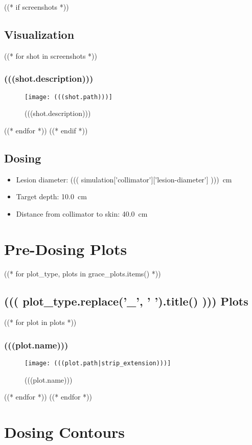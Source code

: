\documentclass[12pt]{article}
\begin{document}
((* if screenshots *))
\subsection{Visualization}
((* for shot in screenshots *))
	\subsubsection{(((shot.description)))}
	\begin{figure}[H]
	\centering
	\texttt{[image: (((shot.path)))]}
	\caption{(((shot.description)))}
	\end{figure}
((* endfor *))
((* endif *))

\subsection{Dosing}
\begin{itemize}
	\item Lesion diameter: \SI{((( simulation['collimator']['lesion-diameter']  )))}{\cm}
	\item Target depth: \SI{10.0}{\cm}
	\item Distance from collimator to skin: \SI{40.0}{\cm}
\end{itemize}

\section{Pre-Dosing Plots}
((* for plot_type, plots in grace_plots.items() *))
	\subsection{((( plot_type.replace('_', ' ').title() ))) Plots}
		((* for plot in plots *))
			\subsubsection{(((plot.name)))}
			\begin{figure}[H]
			\centering
			\texttt{[image: (((plot.path|strip\_extension)))]}
			\caption{(((plot.name)))}
			\label{fig:(((plot.slug)))}
			\end{figure}
		((* endfor *))
((* endfor *))

\section{Dosing Contours}
\end{document}

